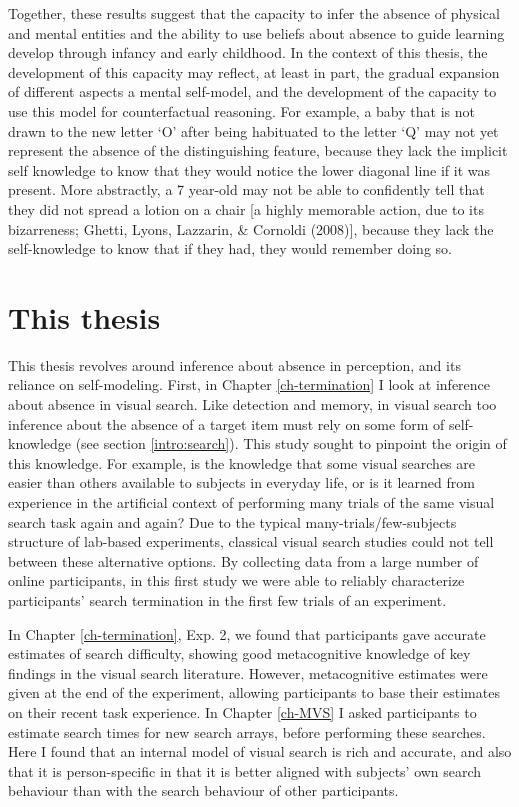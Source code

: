 \documentclass[12pt,twoside]{reedthesis}
\begin{document}
Together, these results suggest that the capacity to infer the absence of physical and mental entities and the ability to use beliefs about absence to guide learning develop through infancy and early childhood. In the context of this thesis, the development of this capacity may reflect, at least in part, the gradual expansion of different aspects a mental self-model, and the development of the capacity to use this model for counterfactual reasoning. For example, a baby that is not drawn to the new letter `O' after being habituated to the letter `Q' may not yet represent the absence of the distinguishing feature, because they lack the implicit self knowledge to know that they would notice the lower diagonal line if it was present. More abstractly, a 7 year-old may not be able to confidently tell that they did not spread a lotion on a chair {[}a highly memorable action, due to its bizarreness; Ghetti, Lyons, Lazzarin, \& Cornoldi (2008){]}, because they lack the self-knowledge to know that if they had, they would remember doing so.

\hypertarget{this-thesis}{%
\section{This thesis}\label{this-thesis}}

This thesis revolves around inference about absence in perception, and its reliance on self-modeling. First, in Chapter \ref{ch-termination} I look at inference about absence in visual search. Like detection and memory, in visual search too inference about the absence of a target item must rely on some form of self-knowledge (see section \ref{intro:search}). This study sought to pinpoint the origin of this knowledge. For example, is the knowledge that some visual searches are easier than others available to subjects in everyday life, or is it learned from experience in the artificial context of performing many trials of the same visual search task again and again? Due to the typical many-trials/few-subjects structure of lab-based experiments, classical visual search studies could not tell between these alternative options. By collecting data from a large number of online participants, in this first study we were able to reliably characterize participants' search termination in the first few trials of an experiment.

In Chapter \ref{ch-termination}, Exp. 2, we found that participants gave accurate estimates of search difficulty, showing good metacognitive knowledge of key findings in the visual search literature. However, metacognitive estimates were given at the end of the experiment, allowing participants to base their estimates on their recent task experience. In Chapter \ref{ch-MVS} I asked participants to estimate search times for new search arrays, before performing these searches. Here I found that an internal model of visual search is rich and accurate, and also that it is person-specific in that it is better aligned with subjects' own search behaviour than with the search behaviour of other participants.
\end{document}
